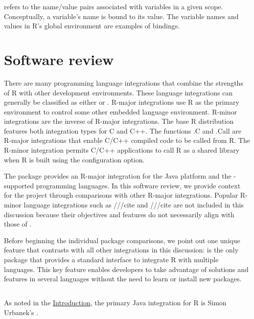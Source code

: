  refers to the name/value pairs associated with variables in a given scope. Conceptually, a variable's name is bound to its value. The variable names and values in R's global environment are examples of bindings.

\hypertarget{softwarereview}{\section{Software review}}

There are many programming language integrations that combine the strengths of R with other development environments. These language integrations can generally be classified as either  or . R-major integrations use R as the primary environment to control some other embedded language environment. R-minor integrations are the inverse of R-major integrations. The base R distribution features both integration types for C and C++. The functions .C and .Call are R-major integrations that enable C/C++ compiled code to be called from R. The R-minor integration permits C/C++ applications to call R as a shared library when R is built using the  configuration option.

The  package provides an R-major integration for the Java platform and the -supported programming languages. In this software review, we provide context for the  project through comparisons with other R-major integrations. Popular R-minor language integrations such as  ///cite and  ///cite are not included in this discussion because their objectives and features do not necessarily align with those of .

Before beginning the individual package comparisons, we point out one unique feature that contrasts  with all other integrations in this discussion:  is the only package that provides a standard interface to integrate R with multiple languages. This key feature enables developers to take advantage of solutions and features in several languages without the need to learn or install new packages.

\subsection{}

As noted in the \hyperlink{introduction}{Introduction}, the primary Java integration for R is Simon Urbanek's . 

